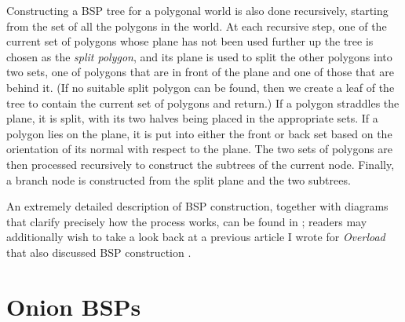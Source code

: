 \documentclass[10pt,twocolumn]{article}
\begin{document}
Constructing a BSP tree for a polygonal world is also done recursively, starting from the set of all the polygons in the world. At each recursive step, one of the current set of polygons whose plane has not been used further up the tree is chosen as the \emph{split polygon}, and its plane is used to split the other polygons into two sets, one of polygons that are in front of the plane and one of those that are behind it. (If no suitable split polygon can be found, then we create a leaf of the tree to contain the current set of polygons and return.) If a polygon straddles the plane, it is split, with its two halves being placed in the appropriate sets. If a polygon lies on the plane, it is put into either the front or back set based on the orientation of its normal with respect to the plane. The two sets of polygons are then processed recursively to construct the subtrees of the current node. Finally, a branch node is constructed from the split plane and the two subtrees.

An extremely detailed description of BSP construction, together with diagrams that clarify precisely how the process works, can be found in \cite{golodetz06}; readers may additionally wish to take a look back at a previous article I wrote for \emph{Overload} that also discussed BSP construction \cite{golodetzoverload08aug}.

\section{Onion BSPs}
\label{sec:onionbsps}
\end{document}

